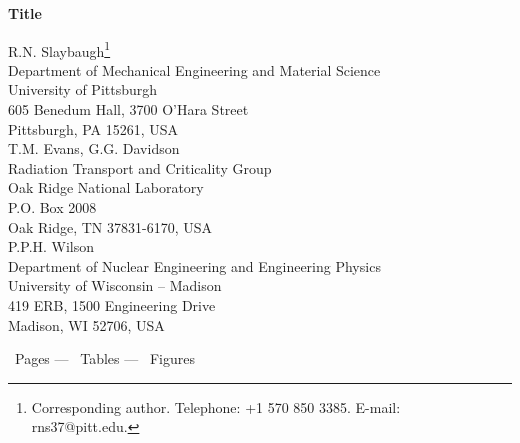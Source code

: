 \documentclass[preprint,12pt]{elsarticle}
\renewcommand{\thetable}{\Roman{table}}
\begin{document}
\singlespacing
\begin{center}

  {\Large \bf Title}
  
  \vspace{0.3in}
  
  {\large R.N. Slaybaugh\footnote{Corresponding author.  Telephone: +1
      570 850 3385.  E-mail: rns37@pitt.edu.}\\
    Department of Mechanical Engineering and Material Science\\
    University of Pittsburgh\\
    605 Benedum Hall, 3700 O'Hara Street\\
    Pittsburgh, PA 15261, USA\\\vspace{1\baselineskip}
    T.M. Evans, G.G. Davidson\\
    Radiation Transport and Criticality Group\\ 
    Oak Ridge National Laboratory\\ 
    P.O. Box 2008\\
    Oak Ridge, TN 37831-6170, USA\\\vspace{1\baselineskip}
    P.P.H. Wilson\\
    Department of Nuclear Engineering and Engineering Physics\\
    University of Wisconsin -- Madison\\
    419 ERB, 1500 Engineering Drive\\
    Madison, WI 52706, USA\\}
  
  \addtocounter{page}{-1}

  \vspace{2.0in}
  \renewcommand{\thetable}{}
  \thepage\ Pages --- \thetable\ Tables --- \thefigure\ Figures \\

  \setcounter{page}{1}

\end{center}

\end{document}
